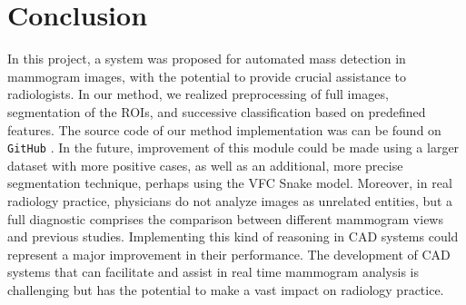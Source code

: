 \section{Conclusion}
\label{sec:print}
In this project, a system was proposed for automated mass detection in mammogram images, with the potential to provide crucial assistance to radiologists. In our method, we realized preprocessing of full images, segmentation of the ROIs, and successive classification based on predefined features. The source code of our method implementation was can be found on \texttt{GitHub} \cite{IMMAS2018}. In the future, improvement of this module could be made using a larger dataset with more positive cases, as well as an additional, more precise segmentation technique, perhaps using the VFC Snake model.
Moreover, in real radiology practice, physicians do not analyze images as unrelated entities, but a full diagnostic comprises the comparison between different mammogram views and previous studies. Implementing this kind of reasoning in CAD systems could represent a major improvement in their performance. The development of CAD systems that can facilitate and assist in real time mammogram analysis is challenging but has the potential to make a vast impact on radiology practice.\par
